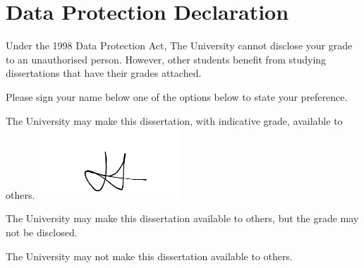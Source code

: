 
\section*{Data Protection Declaration}
\vspace{0.5cm}
\begin{flushleft}
Under the 1998 Data Protection Act, The University cannot disclose your grade to an unauthorised person. However, other students benefit from studying dissertations that have their grades attached. \newline

\vspace{0.5cm}

Please sign your name below one of the options below to state your preference.\newline
\vspace{0.5cm}

The University may make this dissertation, with indicative grade, available to others.\newline
\vspace{1cm}
\includegraphics[width=0.4\textwidth, center]{figures/signature}

The University may make this dissertation available to others, but the grade may not be disclosed.\newline
\vspace{3cm}


The University may not make this dissertation available to others.\newline
\end{flushleft}

